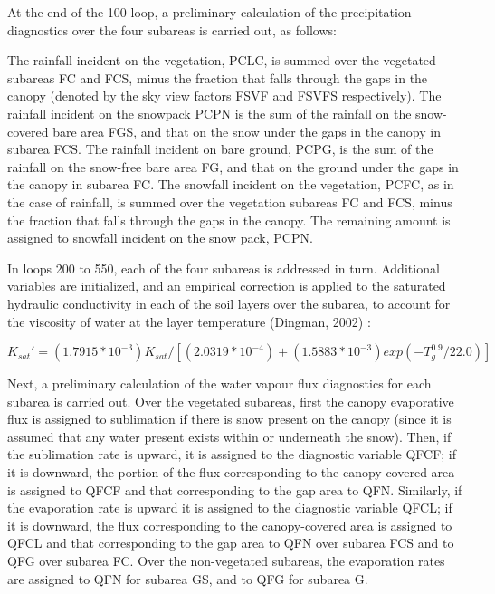 At the end of the 100 loop, a preliminary calculation of the precipitation diagnostics over the four subareas is carried out, as follows\+:

The rainfall incident on the vegetation, P\+C\+L\+C, is summed over the vegetated subareas F\+C and F\+C\+S, minus the fraction that falls through the gaps in the canopy (denoted by the sky view factors F\+S\+V\+F and F\+S\+V\+F\+S respectively). The rainfall incident on the snowpack P\+C\+P\+N is the sum of the rainfall on the snow-\/ covered bare area F\+G\+S, and that on the snow under the gaps in the canopy in subarea F\+C\+S. The rainfall incident on bare ground, P\+C\+P\+G, is the sum of the rainfall on the snow-\/free bare area F\+G, and that on the ground under the gaps in the canopy in subarea F\+C. The snowfall incident on the vegetation, P\+C\+F\+C, as in the case of rainfall, is summed over the vegetation subareas F\+C and F\+C\+S, minus the fraction that falls through the gaps in the canopy. The remaining amount is assigned to snowfall incident on the snow pack, P\+C\+P\+N.

In loops 200 to 550, each of the four subareas is addressed in turn. Additional variables are initialized, and an empirical correction is applied to the saturated hydraulic conductivity in each of the soil layers over the subarea, to account for the viscosity of water at the layer temperature (Dingman, 2002) \cite{Lawrence_Dingman2002-sq} \+:

$K_{sat}' = (1.7915 * 10^{-3}) K_{sat} / [(2.0319 * 10^{-4})+(1.5883 * 10^{-3}) exp(-T_g^{0.9}/22.0)]$

Next, a preliminary calculation of the water vapour flux diagnostics for each subarea is carried out. Over the vegetated subareas, first the canopy evaporative flux is assigned to sublimation if there is snow present on the canopy (since it is assumed that any water present exists within or underneath the snow). Then, if the sublimation rate is upward, it is assigned to the diagnostic variable Q\+F\+C\+F; if it is downward, the portion of the flux corresponding to the canopy-\/covered area is assigned to Q\+F\+C\+F and that corresponding to the gap area to Q\+F\+N. Similarly, if the evaporation rate is upward it is assigned to the diagnostic variable Q\+F\+C\+L; if it is downward, the flux corresponding to the canopy-\/covered area is assigned to Q\+F\+C\+L and that corresponding to the gap area to Q\+F\+N over subarea F\+C\+S and to Q\+F\+G over subarea F\+C. Over the non-\/vegetated subareas, the evaporation rates are assigned to Q\+F\+N for subarea G\+S, and to Q\+F\+G for subarea G.

